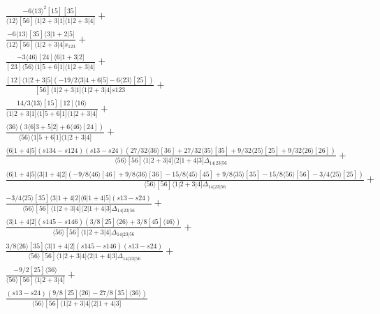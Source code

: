 \documentclass[varwidth, border=5pt]{standalone}
\begin{document}
\begin{my}
$\begin{gathered}
\scriptscriptstyle\frac{-6⟨13⟩^2[15][35]}{⟨12⟩[56]⟨1|2+3|1]⟨1|2+3|4]}+\\
\scriptscriptstyle\frac{-6⟨13⟩[35]⟨3|1+2|5]}{⟨12⟩[56]⟨1|2+3|4]s_{123}}+\\
\scriptscriptstyle\frac{-3⟨46⟩[24]⟨6|1+3|2]}{[23]⟨56⟩⟨1|5+6|1]⟨1|2+3|4]}+\\
\scriptscriptstyle\frac{[12]⟨1|2+3|5](-19/2⟨3|4+6|5]-6⟨23⟩[25])}{[56]⟨1|2+3|1]⟨1|2+3|4]s123}+\\
\scriptscriptstyle\frac{14/3⟨13⟩[15][12]⟨16⟩}{⟨1|2+3|1]⟨1|5+6|1]⟨1|2+3|4]}+\\
\scriptscriptstyle\frac{⟨36⟩(3⟨6|3+5|2]+6⟨46⟩[24])}{⟨56⟩⟨1|5+6|1]⟨1|2+3|4]}+\\
\scriptscriptstyle\frac{⟨6|1+4|5](s134-s124)(s13-s24)(27/32⟨36⟩[36]+27/32⟨35⟩[35]+9/32⟨25⟩[25]+9/32⟨26⟩[26])}{⟨56⟩[56]⟨1|2+3|4]⟨2|1+4|3]Δ_{14|23|56}}+\\
\scriptscriptstyle\frac{⟨6|1+4|5]⟨3|1+4|2](-9/8⟨46⟩[46]+9/8⟨36⟩[36]-15/8⟨45⟩[45]+9/8⟨35⟩[35]-15/8⟨56⟩[56]-3/4⟨25⟩[25])}{⟨56⟩[56]⟨1|2+3|4]Δ_{14|23|56}}+\\
\scriptscriptstyle\frac{-3/4⟨25⟩[35]⟨3|1+4|2]⟨6|1+4|5](s13-s24)}{⟨56⟩[56]⟨1|2+3|4]⟨2|1+4|3]Δ_{14|23|56}}+\\
\scriptscriptstyle\frac{⟨3|1+4|2](s145-s146)(3/8[25]⟨26⟩+3/8[45]⟨46⟩)}{⟨56⟩[56]⟨1|2+3|4]Δ_{14|23|56}}+\\
\scriptscriptstyle\frac{3/8⟨26⟩[35]⟨3|1+4|2](s145-s146)(s13-s24)}{⟨56⟩[56]⟨1|2+3|4]⟨2|1+4|3]Δ_{14|23|56}}+\\
\scriptscriptstyle\frac{-9/2[25]⟨36⟩}{⟨56⟩[56]⟨1|2+3|4]}+\\
\scriptscriptstyle\frac{(s13-s24)(9/8[25]⟨26⟩-27/8[35]⟨36⟩)}{⟨56⟩[56]⟨1|2+3|4]⟨2|1+4|3]}\phantom{+}
\end{gathered}$
\end{my}
\end{document}
